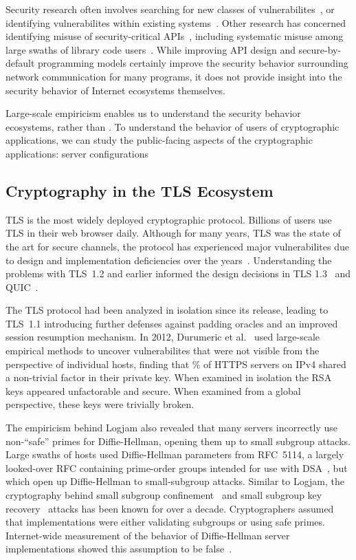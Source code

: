 Security research often involves searching for new classes of
vulnerabilites~\cite{something}, or identifying vulnerabilites within
existing systems~\cite{something}. Other research has concerned identifying
misuse of security-critical APIs~\cite{gutmann-lessons}, including systematic
misuse among large swaths of library code
users~\cite{most-dangerous-code-2012}. While improving API design and
secure-by-default programming models certainly improve the security behavior
surrounding network communication for many programs, it does not provide
insight into the security behavior of Internet ecosystems themselves.

Large-scale empiricism enables us to understand the security behavior
ecosystems, rather than \TK. To understand the behavior of users of
cryptographic applications, we can study the public-facing aspects of the
cryptographic applications: server configurations

\subsection{Cryptography in the TLS Ecosystem}

TLS is the most widely deployed cryptographic protocol. Billions of users use
TLS in their web browser daily. Although for many years, TLS was the state of
the art for secure channels, the protocol has experienced major vulnerabilites
due to design and implementation deficiencies over the
years~\cite{beast-2011,crime-attack,poodle-2014}. Understanding the problems
with TLS~1.2 and earlier informed the design decisions in TLS
1.3~\cite{rfc8446} and QUIC~\cite{ietf-quic-transport-15}.

The TLS protocol had been analyzed in isolation since its release, leading to
TLS~1.1 introducing further defenses against padding oracles and an improved
session resumption mechanism. In 2012, Durumeric et al.~\cite{weakkeys-2012}
used large-scale empirical methods to uncover vulnerabilites that were not
visible from the perspective of individual hosts, finding that \TK\% of HTTPS
servers on IPv4 shared a non-trivial factor in their private key. When examined
in isolation the RSA keys appeared unfactorable and secure. When examined from
a global perspective, these keys were trivially broken.



The empiricism behind Logjam also revealed that many servers incorrectly use
non-``safe'' primes for Diffie-Hellman, opening them up to small subgroup
attacks. Large swaths of hosts used Diffie-Hellman parameters from RFC~5114, a
largely looked-over RFC containing prime-order groups intended for use with
DSA~\cite{rfc5114}, but which open up Diffie-Hellman to small-subgroup
attacks. Similar to Logjam, the cryptography behind small
subgroup confinement~\cite{van1996diffie,anderson-1996} and small subgroup key
recovery~\cite{lim-1997} attacks has been known for over a decade.
Cryptographers assumed that implementations were either validating subgroups or 
using safe primes. Internet-wide measurement of the behavior of Diffie-Hellman 
server implementations showed this assumption to be false~\cite{subgroup-2017}.

